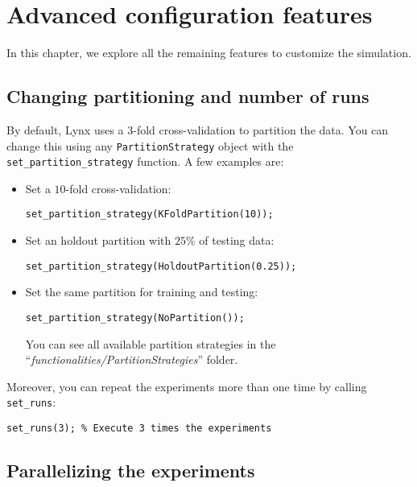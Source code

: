 \chapter{Advanced configuration features}
\label{chap:advancedfeatures}

In this chapter, we explore all the remaining features to customize the simulation.

\section{Changing partitioning and number of runs}

By default, Lynx uses a $3$-fold cross-validation to partition the data. You can change this using any \verb|PartitionStrategy| object with the \verb|set_partition_strategy| function. A few examples are:

\begin{itemize}
\item Set a $10$-fold cross-validation:

\begin{lstlisting}
set_partition_strategy(KFoldPartition(10));
\end{lstlisting}

\item Set an holdout partition with $25\%$ of testing data:

\begin{lstlisting}
set_partition_strategy(HoldoutPartition(0.25));
\end{lstlisting}

\item Set the same partition for training and testing:

\begin{lstlisting}
set_partition_strategy(NoPartition());
\end{lstlisting}

You can see all available partition strategies in the ``\textit{functionalities/PartitionStrategies}'' folder.
\end{itemize}

Moreover, you can repeat the experiments more than one time by calling \verb|set_runs|:

\begin{lstlisting}
set_runs(3); % Execute 3 times the experiments
\end{lstlisting}

\section{Parallelizing the experiments}

